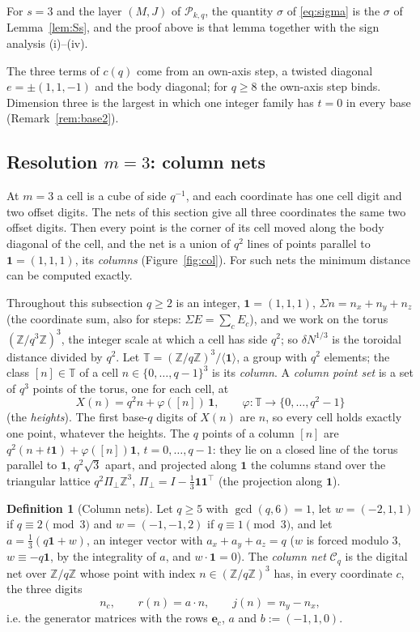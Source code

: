 \documentclass[11pt]{amsart}
\theoremstyle{definition}
\newtheorem{definition}[theorem]{Definition}
\theoremstyle{plain}
\newcommand{\Z}{\mathbb{Z}}
\newcommand{\e}{\mathbf{e}}
\begin{document}
For $s=3$ and the layer $(M,J)$ of $\mathcal P_{k,q}$, the quantity $\sigma$ of \eqref{eq:sigma} is the $\sigma$ of Lemma~\ref{lem:Ss}, and the proof above is that lemma together with the sign analysis (i)--(iv).

The three terms of $c(q)$ come from an own-axis step, a twisted diagonal $e=\pm(1,1,-1)$ and the body diagonal; for $q\ge8$ the own-axis step binds. Dimension three is the largest in which one integer family has $t=0$ in every base (Remark~\ref{rem:base2}).

\subsection{Resolution \texorpdfstring{$m=3$}{m=3}: column nets}\label{sec:m3}
At $m=3$ a cell is a cube of side $q^{-1}$, and each coordinate has one cell digit and two offset digits. The nets of this section give all three coordinates the same two offset digits. Then every point is the corner of its cell moved along the body diagonal of the cell, and the net is a union of $q^2$ lines of points parallel to $\mathbf 1=(1,1,1)$, its \emph{columns} (Figure~\ref{fig:col}). For such nets the minimum distance can be computed exactly.

Throughout this subsection $q\ge2$ is an integer, $\mathbf 1=(1,1,1)$, $\Sigma n=n_x+n_y+n_z$ (the coordinate sum, also for steps: $\Sigma E=\sum_cE_c$), and we work on the torus $(\Z/q^3\Z)^3$, the integer scale at which a cell has side $q^2$; so $\delta N^{1/3}$ is the toroidal distance divided by $q^2$. Let $\mathbb T=(\Z/q\Z)^3/\langle\mathbf 1\rangle$, a group with $q^2$ elements; the class $[n]\in \mathbb T$ of a cell $n\in\{0,\dots,q-1\}^3$ is its \emph{column}. A \emph{column point set} is a set of $q^3$ points of the torus, one for each cell, at
\[
X(n)=q^2n+\varphi([n])\,\mathbf 1,\qquad \varphi:\mathbb T\to\{0,\dots,q^2-1\}
\]
(the \emph{heights}). The first base-$q$ digits of $X(n)$ are $n$, so every cell holds exactly one point, whatever the heights. The $q$ points of a column $[n]$ are $q^2(n+t\mathbf 1)+\varphi([n])\mathbf 1$, $t=0,\dots,q-1$: they lie on a closed line of the torus parallel to $\mathbf 1$, $q^2\sqrt3$ apart, and projected along $\mathbf 1$ the columns stand over the triangular lattice $q^2\Pi_\perp\Z^3$, $\Pi_\perp=I-\frac13\mathbf 1\mathbf 1^{\!\top}$ (the projection along $\mathbf 1$).

\begin{definition}[Column nets]\label{def:col}
Let $q\ge5$ with $\gcd(q,6)=1$, let $w=(-2,1,1)$ if $q\equiv2\pmod3$ and $w=(-1,-1,2)$ if $q\equiv1\pmod3$, and let $a=\frac13(q\mathbf 1+w)$, an integer vector with $a_x+a_y+a_z=q$ ($w$ is forced modulo $3$, $w\equiv-q\mathbf 1$, by the integrality of $a$, and $w\cdot\mathbf 1=0$). The \emph{column net} $\mathcal C_q$ is the digital net over $\Z/q\Z$ whose point with index $n\in(\Z/q\Z)^3$ has, in every coordinate $c$, the three digits
\[
n_c,\qquad r(n)=a\cdot n,\qquad j(n)=n_y-n_x,
\]
i.e. the generator matrices with the rows $\e_c$, $a$ and $b:=(-1,1,0)$.
\end{definition}
\end{document}
